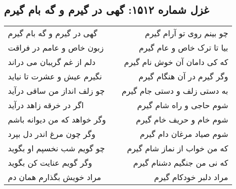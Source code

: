 \begin{center}
\section*{غزل شماره ۱۵۱۲: گهی در گیرم و گه بام گیرم}
\label{sec:1512}
\begin{longtable}{l p{0.5cm} r}
گهی در گیرم و گه بام گیرم
&&
چو بینم روی تو آرام گیرم
\\
زبون خاص و عامم در فراقت
&&
بیا تا ترک خاص و عام گیرم
\\
دلم از غم گریبان می دراند
&&
که کی دامان آن خوش نام گیرم
\\
نگیرم عیش و عشرت تا نیاید
&&
وگر گیرم در آن هنگام گیرم
\\
چو زلف انداز من ساقی درآید
&&
به دستی زلف و دستی جام گیرم
\\
اگر در خرقه زاهد درآید
&&
شوم حاجی و راه شام گیرم
\\
وگر خواهد که من دیوانه باشم
&&
شوم خام و حریف خام گیرم
\\
وگر چون مرغ اندر دل بپرد
&&
شوم صیاد مرغان دام گیرم
\\
چو گویم شب نخسپم او بگوید
&&
که من خواب از نماز شام گیرم
\\
وگر گویم عنایت کن بگوید
&&
که نی من جنگیم دشنام گیرم
\\
مراد خویش بگذارم همان دم
&&
مراد دلبر خودکام گیرم
\\
\end{longtable}
\end{center}
